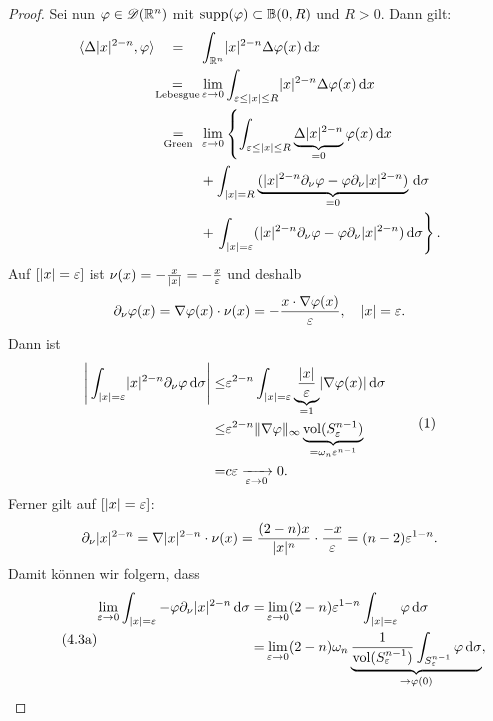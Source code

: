 \begin{proof}
  Sei nun $\varphi\in\mathscr{D}(\mathbb{R}^n)$ mit $\operatorname{supp}(\varphi)\subset\mathbb{B}(0,R)$ und $R>0$. Dann gilt:
  \begin{align}
    \label{eq:4.1}
    \begin{aligned}
      \langle\Delta\lvert x\rvert^{2-n},\varphi\rangle
    \quad   =\quad\,&\int_{\mathbb{R}^n}\lvert x\rvert^{2-n}\Delta\varphi(x)\,\mathrm{d} x \\
      \underset{\scriptsize\text{Lebesgue}}=&
      \lim_{\varepsilon\rightarrow 0}\int_{\varepsilon\leq\lvert x\rvert\leq R}\lvert x\rvert^{2-n}\Delta\varphi(x)\,\mathrm{d} x\\
      \underset{\scriptsize\text{Green}}=\ \, &   \lim_{\varepsilon\rightarrow0}\left\{
        \int_{\varepsilon\leq\lvert x\rvert\leq R}\underbrace{\Delta\lvert x\rvert^{2-n}}_{=0}\varphi(x)\,\mathrm{d} x \right. \\
        & +\int_{\lvert x\rvert=R}\underbrace{(\lvert x\rvert^{2-n}\partial_\nu\varphi-\varphi\partial_\nu\lvert x\rvert^{2-n})}_{=0}\,\mathrm{d}\sigma \\
      &  + \left.\int_{\lvert x\rvert=\varepsilon}(\lvert x\rvert^{2-n}\partial_\nu\varphi-\varphi\partial_\nu\lvert x\rvert^{2-n})\,\mathrm{d}\sigma
      \right\}.
      \end{aligned}
  \end{align}
  Auf $[\lvert x\rvert=\varepsilon]$ ist $\nu(x)=-\frac x{\lvert x\rvert}=-\frac x{\varepsilon}$ und deshalb
  \[ \partial_\nu\varphi(x)=\nabla\varphi(x)\cdot\nu(x)=-\frac{x\cdot\nabla\varphi(x)}{\varepsilon},\quad\lvert x\rvert=\varepsilon. \]
  Dann ist
  \[\begin{split}
    \Abs{\,
      \int_{\abs x=\epsilon}\abs x^{2-n}\partial_\nu\varphi\d\sigma
    }\leq&\epsilon^{2-n}\int_{\abs x=\epsilon}\underbrace{\frac{\abs x}\epsilon}_{=1}\abs{\nabla\varphi(x)}\d\sigma \\
    \leq&\epsilon^{2-n}\norm{\nabla \varphi}_\infty\underbrace{\vol(S^{n-1}_\epsilon)}_{=\omega_n\epsilon^{n-1}} \\
    =&c\epsilon\xrightarrow[\epsilon\ra0]{}0.
  \end{split}
  \eq{eq:4.2}
\]
Ferner gilt auf $[\lvert x\rvert=\varepsilon]$:
\[
\partial_\nu\lvert x\rvert^{2-n}=\nabla\lvert x\rvert^{2-n}\cdot\nu(x)=\frac{(2-n)x}{\lvert x\rvert^n}\cdot\frac{-x}{\varepsilon}=(n-2)\varepsilon^{1-n}.
\]
Damit können wir folgern, dass
  \begin{align}
    \label{eq:4.3}\tag{4.3a}
    \begin{aligned}
    \lim_{\epsilon\ra0}\int_{\abs x=\epsilon}-\varphi\partial_\nu\abs
    x^{2-n}\d\sigma =&\lim_{\epsilon\ra0}(2-n)\epsilon^{1-n}\int_{\abs
      x=\epsilon}\varphi\d\sigma\\
       =&\lim_{\epsilon\ra0}(2-n)\omega_n
    \underbrace{\frac{1}{\vol(S^{n-1}_\epsilon)}\int_{S^{n-1}_\epsilon}\varphi\d\sigma}_{\ra\varphi(0)},

\end{aligned}
\end{align}
\end{proof}
